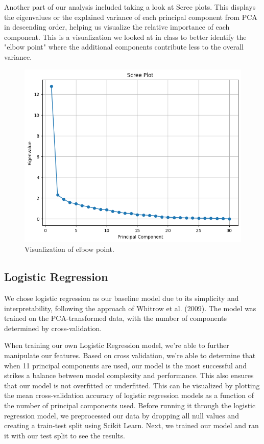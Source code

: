 \documentclass{article}
\begin{document}
Another part of our analysis included taking a look at Scree plots. This displays the eigenvalues or the explained variance of each principal component from PCA in descending order, helping us visualize the relative importance of each component. This is a visualization we looked at in class to better identify the "elbow point" where the additional components contribute less to the overall variance.

\begin{figure}[H]
    \centering
    \includegraphics[width=.8\textwidth]{screeplot.png} 
    \caption{Visualization of elbow point.}
    \label{fig:screeplot}
\end{figure}

\subsection{Logistic Regression}
We chose logistic regression as our baseline model due to its simplicity and interpretability, following the approach of Whitrow et al. (2009). The model was trained on the PCA-transformed data, with the number of components determined by cross-validation.

When training our own Logistic Regression model, we're able to further manipulate our features. Based on cross validation, we're able to determine that when 11 principal components are used, our model is the most successful and strikes a balance between model complexity and performance. This also ensures that our model is not overfitted or underfitted. This can be visualized by plotting the mean cross-validation accuracy of logistic regression models as a function of the number of principal components used. Before running it through the logistic regression model, we preprocessed our data by dropping all null values and creating a train-test split using Scikit Learn. Next, we trained our model and ran it with our test split to see the results.
\end{document}
